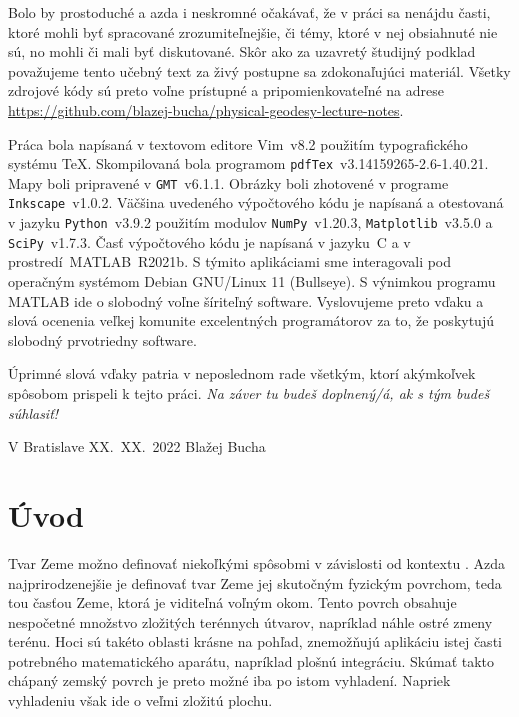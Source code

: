 \documentclass[a4paper, 12pt]{book}
\begin{document}
Bolo by prostoduché a azda i neskromné očakávať, že v práci sa nenájdu časti, 
ktoré mohli byť spracované zrozumiteľnejšie, či témy, ktoré v nej obsiahnuté 
nie sú, no mohli či mali byť diskutované.  Skôr ako za uzavretý študijný 
podklad považujeme tento učebný text za živý postupne sa zdokonaľujúci 
materiál.  Všetky zdrojové kódy sú preto voľne prístupné a pripomienkovateľné 
na adrese \url{https://github.com/blazej-bucha/physical-geodesy-lecture-notes}.

Práca bola napísaná v textovom editore Vim~v8.2 použitím typografického systému 
\TeX.  Skompilovaná bola programom \texttt{pdfTex}~v3.14159265-2.6-1.40.21.  
Mapy boli pripravené v \texttt{GMT}~v6.1.1.  Obrázky boli zhotovené v programe 
\texttt{Inkscape}~v1.0.2.  Väčšina uvedeného výpočtového kódu je napísaná 
a otestovaná v jazyku \texttt{Python}~v3.9.2 použitím modulov 
\texttt{NumPy}~v1.20.3, \texttt{Matplotlib}~v3.5.0 a \texttt{SciPy}~v1.7.3.  
Časť výpočtového kódu je napísaná v jazyku~C a v prostredí~MATLAB~R2021b.  
S týmito aplikáciami sme interagovali pod operačným systémom Debian GNU/Linux 
11 (Bullseye).  S výnimkou programu MATLAB ide o slobodný voľne šíriteľný 
software.  Vyslovujeme preto vďaku a slová ocenenia veľkej komunite 
excelentných programátorov za to, že poskytujú slobodný prvotriedny software.

Úprimné slová vďaky patria v neposlednom rade všetkým, ktorí akýmkoľvek 
spôsobom prispeli k tejto práci. \emph{Na záver tu budeš doplnený/á, ak s tým 
budeš súhlasiť!}


\vspace{4ex}

\noindent V Bratislave XX.~XX.~2022 \hfill Blažej Bucha





\chapter{Úvod}

Tvar Zeme možno definovať niekoľkými spôsobmi v závislosti od kontextu 
\citep{MoritzTheFigureOfTheEarth}.  Azda najprirodzenejšie je definovať tvar 
Zeme jej skutočným fyzickým povrchom, teda tou časťou Zeme, ktorá je viditeľná 
voľným okom.  Tento povrch obsahuje nespočetné množstvo zložitých terénnych 
útvarov, napríklad náhle ostré zmeny terénu.  Hoci sú takéto oblasti krásne na 
pohľad, znemožňujú aplikáciu istej časti potrebného matematického aparátu, 
napríklad plošnú integráciu.  Skúmať takto chápaný zemský povrch je preto možné 
iba po istom vyhladení.  Napriek vyhladeniu však ide o veľmi zložitú plochu.
\end{document}
